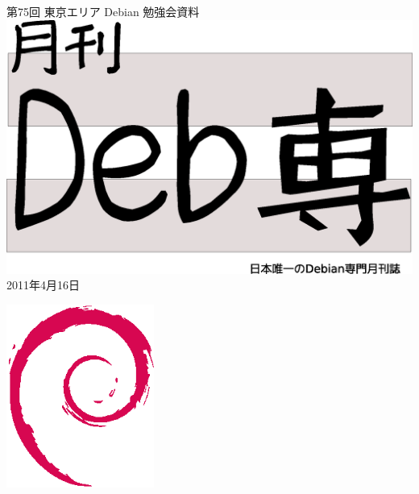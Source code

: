 \documentclass[mingoth,a4paper]{jsarticle}
\newcommand{\debmtgyear}{2011}
\newcommand{\debmtgmonth}{4}
\newcommand{\debmtgdate}{16}
\newcommand{\debmtgnumber}{75}
\begin{document}
\begin{titlepage}
\thispagestyle{empty}

\vspace*{-2cm}
第\debmtgnumber{}回 東京エリア Debian 勉強会資料\\
\hspace*{-2cm}
\includegraphics[width=210mm]{image201003/debsen.eps}\\
\hfill{}\debmtgyear{}年\debmtgmonth{}月\debmtgdate{}日



\vspace*{-2cm}
\hfill{}\includegraphics[height=6cm]{image200502/openlogo-nd.eps}
\end{titlepage}

\end{document}
